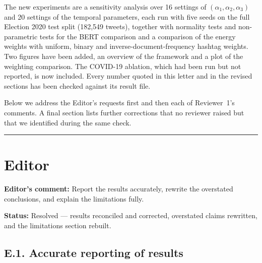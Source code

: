 \documentclass[11pt,a4paper]{article}
\newcommand{\status}[1]{\textbf{\color{statusgreen}Status:} #1}
\begin{document}
The new experiments are a sensitivity analysis over 16 settings of $(\alpha_1, \alpha_2, \alpha_3)$ and 20 settings of the temporal parameters, each run with five seeds on the full Election 2020 test split (182,549 tweets), together with normality tests and non-parametric tests for the BERT comparison and a comparison of the energy weights with uniform, binary and inverse-document-frequency hashtag weights. Two figures have been added, an overview of the framework and a plot of the weighting comparison. The COVID-19 ablation, which had been run but not reported, is now included. Every number quoted in this letter and in the revised sections has been checked against its result file.

Below we address the Editor's requests first and then each of Reviewer~1's comments. A final section lists further corrections that no reviewer raised but that we identified during the same check.

\par\noindent\rule{\linewidth}{0.4pt}\par

\section{Editor}

\begin{revcomment}
\textbf{Editor's comment:} Report the results accurately, rewrite the overstated conclusions, and explain the limitations fully.
\end{revcomment}

\status{Resolved --- results reconciled and corrected, overstated claims rewritten, and the limitations section rebuilt.}

\subsection{E.1. Accurate reporting of results}
\end{document}
